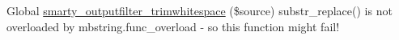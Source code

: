
\begin{DoxyRefList}
\item[Global \mbox{\hyperlink{outputfilter_8trimwhitespace_8php_a622a599502ae1b5d70a7cb3301e8d484}{smarty\+\_\+outputfilter\+\_\+trimwhitespace}} (\$source)]\label{todo__todo000001}%
%
substr\+\_\+replace() is not overloaded by mbstring.\+func\+\_\+overload -\/ so this function might fail! 
\end{DoxyRefList}